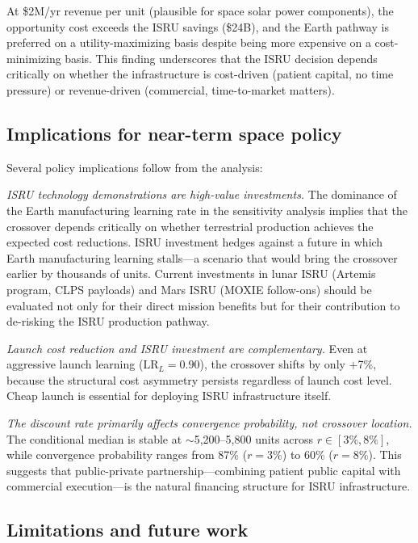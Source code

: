 \documentclass[preprint,12pt]{elsarticle}
\begin{document}
At \$2M/yr revenue per unit (plausible for space solar power components), the opportunity cost exceeds the ISRU savings (\$24B), and the Earth pathway is preferred on a utility-maximizing basis despite being more expensive on a cost-minimizing basis. This finding underscores that the ISRU decision depends critically on whether the infrastructure is cost-driven (patient capital, no time pressure) or revenue-driven (commercial, time-to-market matters).

\subsection{Implications for near-term space policy}

Several policy implications follow from the analysis:

\emph{ISRU technology demonstrations are high-value investments.} The dominance of the Earth manufacturing learning rate in the sensitivity analysis implies that the crossover depends critically on whether terrestrial production achieves the expected cost reductions. ISRU investment hedges against a future in which Earth manufacturing learning stalls---a scenario that would bring the crossover earlier by thousands of units. Current investments in lunar ISRU (Artemis program, CLPS payloads) and Mars ISRU (MOXIE follow-ons) should be evaluated not only for their direct mission benefits but for their contribution to de-risking the ISRU production pathway.

\emph{Launch cost reduction and ISRU investment are complementary.} Even at aggressive launch learning ($\mathrm{LR}_L = 0.90$), the crossover shifts by only $+$7\%, because the structural cost asymmetry persists regardless of launch cost level. Cheap launch is essential for deploying ISRU infrastructure itself.

\emph{The discount rate primarily affects convergence probability, not crossover location.} The conditional median is stable at $\sim$5{,}200--5{,}800 units across $r \in [3\%, 8\%]$, while convergence probability ranges from 87\% ($r = 3\%$) to 60\% ($r = 8\%$). This suggests that public-private partnership---combining patient public capital with commercial execution---is the natural financing structure for ISRU infrastructure.

\subsection{Limitations and future work}
\end{document}
